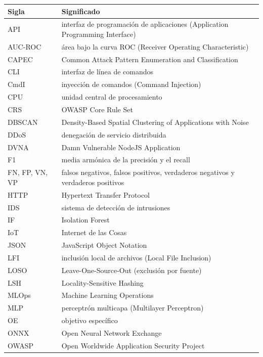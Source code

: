 \begin{longtable}{@{}p{3.2cm}p{10.8cm}@{}}
\textbf{Sigla} & \textbf{Significado} \\ \hline
\endhead
API & interfaz de programación de aplicaciones (Application Programming Interface) \\
AUC-ROC & área bajo la curva ROC (Receiver Operating Characteristic) \\
CAPEC & Common Attack Pattern Enumeration and Classification \\
CLI & interfaz de línea de comandos \\
CmdI & inyección de comandos (Command Injection) \\
CPU & unidad central de procesamiento \\
CRS & OWASP Core Rule Set \\
DBSCAN & Density-Based Spatial Clustering of Applications with Noise \\
DDoS & denegación de servicio distribuida \\
DVNA & Damn Vulnerable NodeJS Application \\
F1 & media armónica de la precisión y el recall \\
FN, FP, VN, VP & falsos negativos, falsos positivos, verdaderos negativos y verdaderos positivos \\
HTTP & Hypertext Transfer Protocol \\
IDS & sistema de detección de intrusiones \\
IF & Isolation Forest \\
IoT & Internet de las Cosas \\
JSON & JavaScript Object Notation \\
LFI & inclusión local de archivos (Local File Inclusion) \\
LOSO & Leave-One-Source-Out (exclusión por fuente) \\
LSH & Locality-Sensitive Hashing \\
MLOps & Machine Learning Operations \\
MLP & perceptrón multicapa (Multilayer Perceptron) \\
OE & objetivo específico \\
ONNX & Open Neural Network Exchange \\
OWASP & Open Worldwide Application Security Project \\

\end{longtable}
